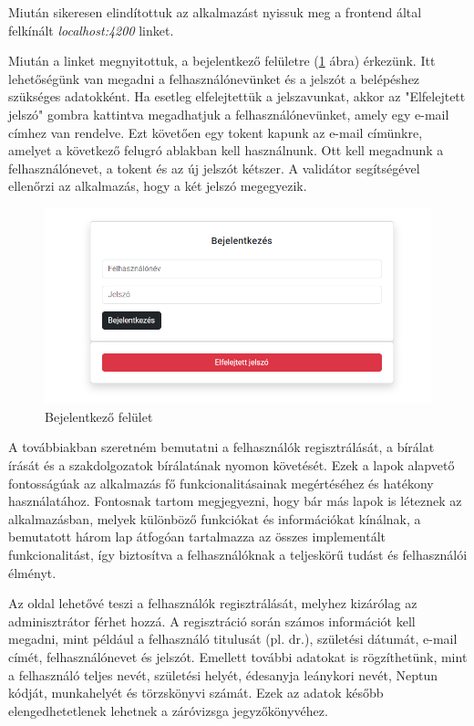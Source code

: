 Miután sikeresen elindítottuk az alkalmazást nyissuk meg a frontend által felkínált \textit{localhost:4200} linket.


Miután a linket megnyitottuk, a bejelentkező felületre (\ref{fig:login} ábra) érkezünk. Itt lehetőségünk van megadni a felhasználónevünket és a jelszót a belépéshez szükséges adatokként. Ha esetleg elfelejtettük a jelszavunkat, akkor az "Elfelejtett jelszó" gombra kattintva megadhatjuk a felhasználónevünket, amely egy e-mail címhez van rendelve. Ezt követően egy tokent kapunk az e-mail címünkre, amelyet a következő felugró ablakban kell használnunk. Ott kell megadnunk a felhasználónevet, a tokent és az új jelszót kétszer. A validátor segítségével ellenőrzi az alkalmazás, hogy a két jelszó megegyezik.

\begin{figure}[h]
\centering
\includegraphics[width=\textwidth]{images/login.png}
\caption{Bejelentkező felület}
\label{fig:login}
\end{figure}

\newpage

A továbbiakban szeretném bemutatni a felhasználók regisztrálását, a bírálat írását és a szakdolgozatok bírálatának nyomon követését. Ezek a lapok alapvető fontosságúak az alkalmazás fő funkcionalitásainak megértéséhez és hatékony használatához. Fontosnak tartom megjegyezni, hogy bár más lapok is léteznek az alkalmazásban, melyek különböző funkciókat és információkat kínálnak, a bemutatott három lap átfogóan tartalmazza az összes implementált funkcionalitást, így biztosítva a felhasználóknak a teljeskörű tudást és felhasználói élményt.





Az oldal lehetővé teszi a felhasználók regisztrálását, melyhez kizárólag az adminisztrátor férhet hozzá. A regisztráció során számos információt kell megadni, mint például a felhasználó titulusát (pl. dr.), születési dátumát, e-mail címét, felhasználónevet és jelszót. Emellett további adatokat is rögzíthetünk, mint a felhasználó teljes nevét, születési helyét, édesanyja leánykori nevét, Neptun kódját, munkahelyét és törzskönyvi számát. Ezek az adatok később elengedhetetlenek lehetnek a záróvizsga jegyzőkönyvéhez.

